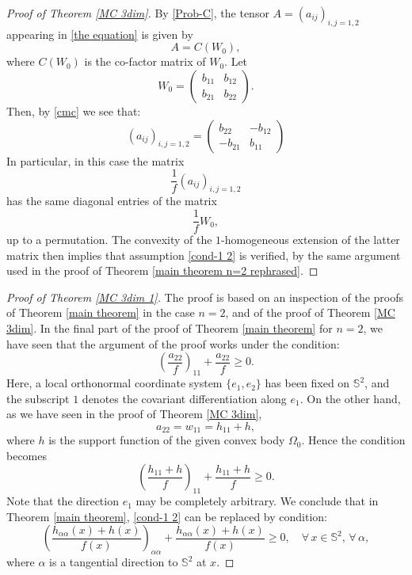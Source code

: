 \documentclass[12pt]{amsart}
\newcommand{\1}{\mathbf 1}
\newcommand{\s}{\mathbb S}
\begin{document}
\begin{proof}[Proof of Theorem \ref{MC 3dim}] 
By \eqref{Prob-C}, the tensor $A=(a_{ij})_{i,j=1,2}$ appearing in \eqref{the equation} is given by
$$
A=C(W_0),
$$
where $C(W_0)$ is the co-factor matrix of $W_0$. Let
$$
W_0=
\left(
\begin{array}{cc}
b_{11}     &b_{12}  \\
b_{21}     &b_{22} 
\end{array}
\right).
$$
Then, by \eqref{cmc} we see that:
$$
(a_{ij})_{i,j=1,2}=
\left(
\begin{array}{cc}
b_{22}      &-b_{12}  \\
-b_{21}     &b_{11} 
\end{array}
\right)
$$
In particular, in this case the matrix 
$$
\frac1f(a_{ij})_{i,j=1,2}
$$ 
has the same diagonal entries of the matrix 
$$
\frac1f W_0,
$$ 
up to a permutation. The convexity of the $1$-homogeneous extension of the latter matrix then implies that assumption 
\eqref{cond-1 2} is verified, by the same argument used in the proof of Theorem \ref{main theorem n=2 rephrased}.
\end{proof}

\begin{proof}[Proof of Theorem \ref{MC 3dim 1}]
The proof is based on an inspection of the proofs of Theorem \ref{main theorem} in the case $n=2$, and of the proof of Theorem \ref{MC 3dim}. In the final part of the proof of Theorem \ref{main theorem} for $n=2$, we have seen that the argument of the proof works under the condition:
$$
\left(\frac{a_{22}}{f}\right)_{11}+\frac{a_{22}}f\ge0.
$$
Here, a local orthonormal coordinate system $\{e_1,e_2\}$ has been fixed on $\s^2$, and the subscript $1$ denotes the covariant differentiation along $e_1$. On the other hand, as we have seen in the proof of Theorem \ref{MC 3dim}, 
$$
a_{22}=w_{11}=h_{11}+h,
$$
where $h$ is the support function of the given convex body $\Omega_0$. Hence the condition becomes
$$
\left(\frac{h_{11}+h}{f}\right)_{11}+\frac{h_{11}+h}f\ge0.
$$
Note that the direction $e_1$ may be completely arbitrary. We conclude that in Theorem \ref{main theorem}, \eqref{cond-1 2} can be replaced by condition:  
\begin{equation}\label{new form dim two}
\left(\frac{h_{\alpha\alpha}(x)+h(x)}{f(x)}\right)_{\alpha\alpha}+\frac{h_{\alpha\alpha}(x)+h(x)}{f(x)}\ge0,\quad\forall\, x\in\s^2,\, \forall\, \alpha,
\end{equation}
where $\alpha$ is a tangential direction to $\s^2$ at $x$. 
\end{proof}
\end{document}

